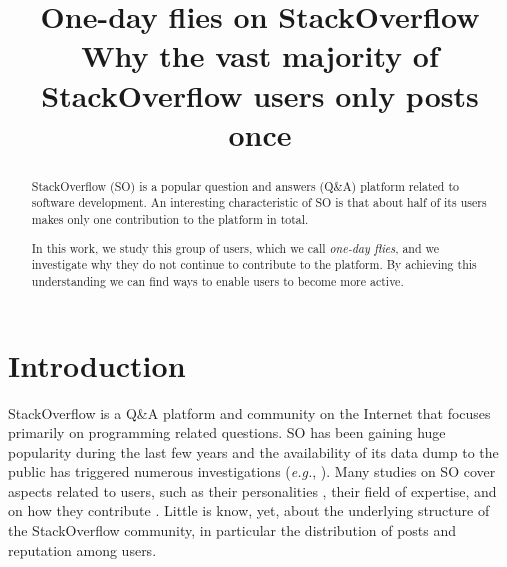 \documentclass[conference]{IEEEtran}
\newcommand{\eg}{\emph{e.g.},\xspace}
\newcommand\odf{\emph{one-day flies}\xspace}
\begin{document}
\title{One-day flies on StackOverflow\\
{\LARGE Why the vast majority of StackOverflow users only posts once}}



\author{
}





\maketitle


\begin{abstract}


StackOverflow (SO) is a popular question and answers (Q\&A) platform related to
software development. An interesting characteristic of SO is that about 
half of its users makes only one contribution to the platform in total.

In this work, we study this group of users, which we call \odf, and we 
investigate why they do not continue to contribute to the platform.
By achieving this understanding we can find ways to enable
users to become more active. 
\end{abstract}

\IEEEpeerreviewmaketitle



\section{Introduction}

StackOverflow is a Q\&A platform and community on the Internet that focuses
primarily on programming related questions. SO has been gaining huge popularity
during the last few years \cite{anderson2012discovering} and the availability
of its data dump to the public has triggered numerous investigations (\eg
\cite{treude2011programmers,barua2014developers,morrison2013age}).  Many
studies on SO cover aspects related to users, such as their personalities
\cite{bosu2013building}, their field of expertise, and on how they contribute
\cite{movshovitz2013analysis}. Little is know, yet, about the underlying
structure of the StackOverflow community, in particular the distribution of
posts and reputation among users.
\end{document}
